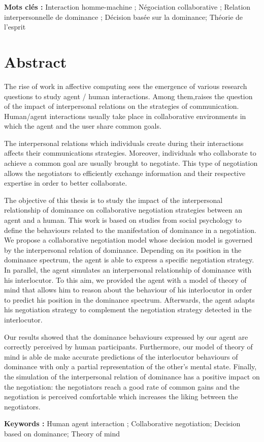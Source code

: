 \begin{otherlanguage}{french}
\vspace{2em}
\par \textbf{Mots clés :} Interaction homme-machine ; Négociation collaborative ; Relation interpersonnelle de dominance ; Décision basée sur la dominance; Théorie de l'esprit
\end{otherlanguage}


\vfill
\clearpage
\chapter*{Abstract}

The rise of work in affective computing sees the emergence of various research questions to study agent / human interactions. Among them,raises the question of the impact of interpersonal relations on the strategies of communication.
Human/agent interactions usually take place in collaborative environments in which the agent and the user share common goals.

The interpersonal relations which individuals create during their interactions affects their communications strategies. Moreover, individuals who collaborate to achieve a common goal are usually brought to negotiate. This type of negotiation allows the negotiators to efficiently exchange information and their respective expertise in order to better collaborate.

The objective of this thesis is to study the impact of the interpersonal relationship of dominance on collaborative negotiation strategies between an agent and a human.
This work is based on studies from social psychology to define the behaviours related to the manifestation of dominance in a negotiation.
We propose a collaborative negotiation model whose decision model is governed by the interpersonal relation of dominance.
Depending on its position in the dominance spectrum, the agent is able to express a specific negotiation strategy.
In parallel, the agent simulates an interpersonal relationship of dominance with his interlocutor. To this aim, we provided the agent with a model of theory of mind that allows him to reason about the behaviour of his interlocutor in order to predict his position in the dominance spectrum. Afterwards, the agent adapts his negotiation strategy to complement the negotiation strategy detected in the interlocutor.

Our results showed that the dominance behaviours expressed by our agent are correctly perceived by human participants. Furthermore, our model of theory of mind is able de make accurate predictions of the interlocutor behaviours of dominance with only a partial representation of the other's mental state.
Finally, the simulation of the interpersonal relation of dominance has a positive impact on the negotiation: the negotiators reach a good rate of common gains and the negotiation is perceived comfortable which increases the liking between the negotiators.

\vspace{2em}
\par \textbf{Keywords :} Human agent interaction ; Collaborative negotiation; Decision based on dominance; Theory of mind

